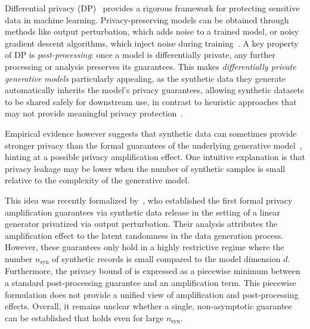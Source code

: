 \documentclass{article}
\theoremstyle{plain}
\theoremstyle{definition}
\theoremstyle{remark}
\begin{document}
Differential privacy (DP)~\citep{Dwork2014} provides a rigorous framework for protecting sensitive data in machine learning. Privacy-preserving models can be obtained through methods like output perturbation\citep{chaudhuri2011differentiallyprivateempiricalrisk,Zhang20172,Lowy2024}, which adds noise to a trained model, or noisy gradient descent algorithms, which inject noise during training~\citep{private_sgd,Bassily2014a,Abadi2016,Feldman2018}. 
A key property of DP is \emph{post-processing}: once a model is differentially private, any further processing or analysis preserves its guarantees. This makes \emph{differentially private generative models} \citep{Zhang2017,xie2018,mckenna2019,Jordon2018,McKenna2021,Lee2022,dockhorn2022,bie2023private} particularly appealing, as the synthetic data they generate automatically inherits the model's privacy guarantees, allowing synthetic datasets to be shared safely for downstream use, in contrast to heuristic approaches that may not provide meaningful privacy protection~\citep{zhao2025does,ponomareva2025dpfydatapracticalguide}.

Empirical evidence however suggests that synthetic data can sometimes provide stronger privacy than the formal guarantees of the underlying generative model~\citep{Annamalai2024, Houssiau2022}, hinting at a possible privacy amplification effect. One intuitive explanation is that privacy leakage may be lower when the number of synthetic samples is small relative to the complexity of the generative model.


This idea was recently formalized by~\citet{pierquin2025}, who established the first formal privacy amplification guarantees via synthetic data release in the setting of a linear generator privatized via output perturbation. Their analysis attributes the amplification effect to the latent randomness in the data generation process. However, these guarantees only hold in a highly restrictive regime where the number $n_{\mathrm{syn}}$ of synthetic records is small compared to the model dimension $d$.
Furthermore, the privacy bound of \citet{pierquin2025} is expressed as a piecewise minimum between a standard post-processing guarantee and an amplification term. This piecewise formulation does not provide a unified view of amplification and post-processing effects. Overall, it remains unclear whether a single, non-asymptotic guarantee can be established that holds even for large $n_{\mathrm{syn}}$.
\end{document}

